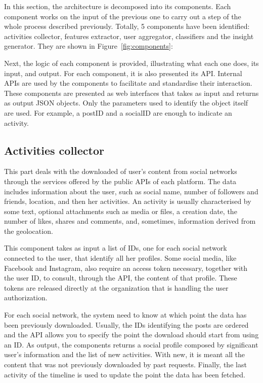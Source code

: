 In this section, the architecture is decomposed into its components. Each component works on the input of the previous one to carry out a step of the whole process described previously.
Totally, 5 components have been identified: activities collector, features extractor, user aggregator, classifiers and the insight generator. They are shown in Figure~\ref{fig:components}:


Next, the logic of each component is provided, illustrating what each one does, its input, and output.
For each component, it is also presented its API. Internal APIs are used by the components to facilitate and standardise their interaction.
These components are presented as web interfaces that takes as input and returns as output JSON objects.
Only the parameters used to identify the object itself are used. For example, a postID and a socialID are enough to indicate an activity.

\subsection{Activities collector}
This part deals with the downloaded of user's content from social networks through the services offered by the public APIs of each platform.
The data includes information about the user, such as social name, number of followers and friends, location, and then her activities.
An activity is usually characterised by some text, optional attachments such as media or files, a creation date, the number of likes, shares and comments, and, sometimes, information derived from the geolocation.

This component takes as input a list of IDs, one for each social network connected to the user, that identify all her profiles. Some social media, like Facebook and Instagram, also require an access token necessary, together with the user ID, to consult, through the API, the content of that profile.
These tokens are released directly at the organization that is handling the user authorization.

For each social network, the system need to know at which point the data has been previously downloaded. Usually, the IDs identifying the posts are ordered and the API allows you to specify the point the download should start from using an ID.
As output, the components returns a social profile composed by significant user's information and the list of new activities. With new, it is meant all the content that was not previously downloaded by past requests.
Finally, the last activity of the timeline is used to update the point the data has been fetched.


